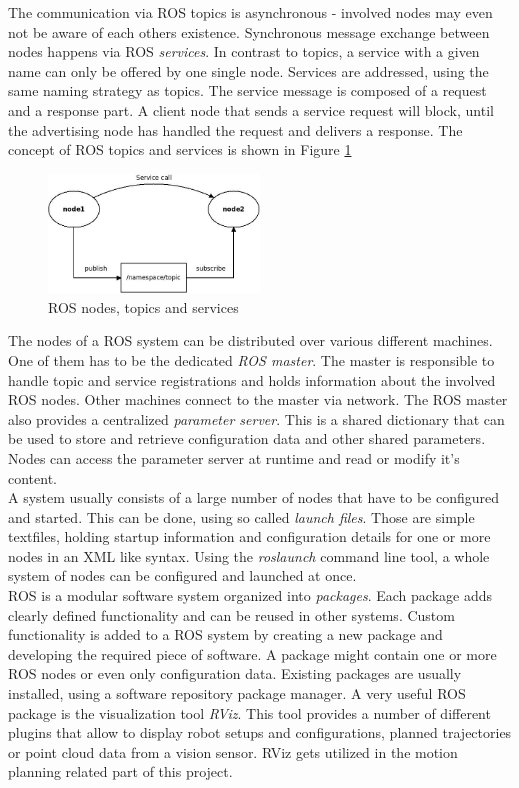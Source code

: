 The communication via ROS topics is asynchronous - involved nodes may even not be aware of each others existence. Synchronous message exchange between nodes happens via ROS \emph{services}. In contrast to topics, a service with a given name can only be offered by one single node. Services are addressed, using the same naming strategy as topics. The service message is composed of a request and a response part. A client node that sends a service request will block, until the advertising node has handled the request and delivers a response. The concept of ROS topics and services is shown in Figure \ref{fig:ros_concept}
\begin{figure}[h]
	\centering
  \includegraphics[width=0.5\textwidth]{images/ros_concept.jpg}
	\caption{ROS nodes, topics and services}
	\label{fig:ros_concept}
\end{figure}

The nodes of a ROS system can be distributed over various different machines. One of them has to be the dedicated \emph{ROS master}. The master is responsible to handle topic and service registrations and holds information about the involved ROS nodes. Other machines connect to the master via network. The ROS master also provides a centralized \emph{parameter server}. This is a shared dictionary that can be used to store and retrieve configuration data and other shared parameters. Nodes can access the parameter server at runtime and read or modify it's content. \\

A system usually consists of a large number of nodes that have to be configured and started. This can be done, using so called \emph{launch files}. Those are simple textfiles, holding startup information and configuration details for one or more nodes in an XML like syntax. Using the \emph{roslaunch} command line tool, a whole system of nodes can be configured and launched at once. \\

ROS is a modular software system organized into \emph{packages}. Each package adds clearly defined functionality and can be reused in other systems. Custom functionality is added to a ROS system by creating a new package and developing the required piece of software. A package might contain one or more ROS nodes or even only configuration data. Existing packages are usually installed, using a software repository package manager. A very useful ROS package is the visualization tool \emph{RViz}. This tool provides a number of different plugins that allow to display robot setups and configurations, planned trajectories or point cloud data from a vision sensor. RViz gets utilized in the motion planning related part of this project.